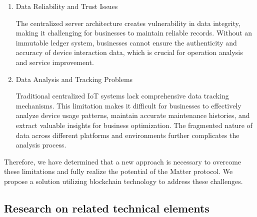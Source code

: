 \documentclass[conference]{IEEEtran}
\begin{document}
	\begin{enumerate}[itemsep=2ex, parsep=1ex]
		\item Data Reliability and Trust Issues

			The centralized server architecture creates vulnerability in data
			integrity, making it challenging for businesses to maintain reliable records.
			Without an immutable ledger system, businesses cannot ensure the authenticity
			and accuracy of device interaction data, which is crucial for operation
			analysis and service improvement.

		\item Data Analysis and Tracking Problems

			Traditional centralized IoT systems lack comprehensive data tracking
			mechanisms. This limitation makes it difficult for businesses to effectively
			analyze device usage patterns, maintain accurate maintenance histories, and
			extract valuable insights for business optimization. The fragmented nature
			of data across different platforms and environments further complicates
			the analysis process.
	\end{enumerate}

	Therefore, we have determined that a new approach is necessary to overcome these
	limitations and fully realize the potential of the Matter protocol. We propose
	a solution utilizing blockchain technology to address these challenges.

	\subsection{Research on related technical elements}
\end{document}
